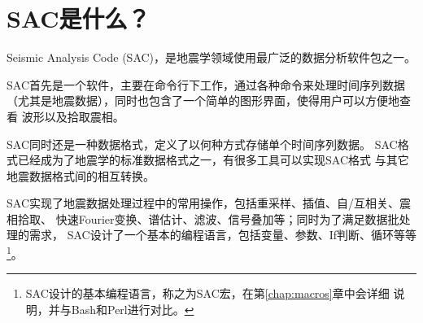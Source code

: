 \section{SAC是什么？}

Seismic Analysis Code (SAC)，是地震学领域使用最广泛的数据分析软件包之一。

SAC首先是一个软件，主要在命令行下工作，通过各种命令来处理时间序列数据
（尤其是地震数据），同时也包含了一个简单的图形界面，使得用户可以方便地查看
波形以及拾取震相。

SAC同时还是一种数据格式，定义了以何种方式存储单个时间序列数据。
SAC格式已经成为了地震学的标准数据格式之一，有很多工具可以实现SAC格式
与其它地震数据格式间的相互转换。

SAC实现了地震数据处理过程中的常用操作，包括重采样、插值、自/互相关、震相拾取、
快速Fourier变换、谱估计、滤波、信号叠加等；同时为了满足数据批处理的需求，
SAC设计了一个基本的编程语言，包括变量、参数、If判断、循环等等
\footnote{SAC设计的基本编程语言，称之为SAC宏，在第\ref{chap:macros}章中会详细
说明，并与Bash和Perl进行对比。}。
